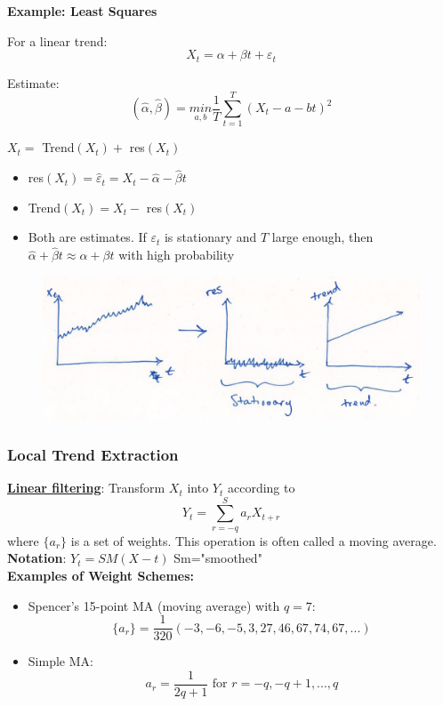 \textbf{Example: \quad Least Squares}

For a linear trend: \[X_t=\alpha + \beta t + \varepsilon_t\]

Estimate: \[(\hat{\alpha}, \hat{\beta})=\underset{a,b}{min} \frac{1}{T} \sum_{t=1}^T (X_t-a-bt)^2\]


$X_t =$ Trend$(X_t) + $ res$(X_t)$
\begin{itemize}
    \item res$(X_t)=\hat{\varepsilon}_t=X_t-\hat{\alpha} -\hat{\beta}t $
    \item Trend$(X_t)=X_t-$ res$(X_t)$
    \item Both are estimates. If $\varepsilon_t$ is stationary and $T$ large enough, then $\hat{\alpha}+\hat{\beta}t \approx \alpha+\beta t$ with high probability
\end{itemize}

\begin{figure}[H]
\includegraphics[scale=0.3]{images/Screenshot 2024-03-29 at 16.08.14.jpg}
\centering
\end{figure}

\subsubsection{Local Trend Extraction}

\textbf{\underline{Linear filtering}}: Transform $X_t$ into $Y_t$ according to \[Y_t = \sum_{r=-q}^S a_rX_{t+r}\] where $\{a_r\}$ is a set of weights. This operation is often called a moving average.\\

\textbf{Notation}: $Y_t=SM(X-t)$ \quad Sm="smoothed" \\

\textbf{Examples of Weight Schemes:}
\begin{itemize}
    \item Spencer's 15-point MA (moving average) with $q=7$:
    \[\{a_r\}=\frac{1}{320}(-3,-6,-5,3,27,46,67,74,67,...)\]
    \item Simple MA:
    \[a_r=\frac{1}{2q+1} \text{ for } r=-q,-q+1,...,q\]
\end{itemize}


